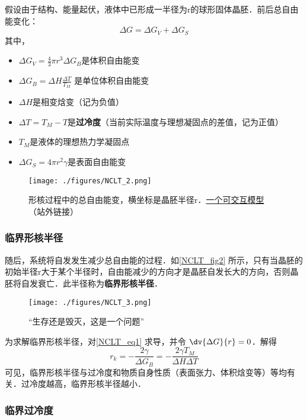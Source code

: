 假设由于结构、能量起伏，液体中已形成一半径为r的球形固体晶胚．前后总自由能变化： 
\begin{equation}\label{NCLT_eq1}
\Delta G  = \Delta G_V +\Delta G_S
\end{equation}
其中，
\begin{itemize}
\item $\Delta G_V = \frac{4}{3}\pi r^3 \Delta G_B$是体积自由能变
\item $\Delta G_B = \Delta H \frac{\Delta T}{T_M}$ 是单位体积自由能变
\item $\Delta H$是相变焓变（记为负值）
\item $\Delta T=T_M-T$是\textbf{过冷度}（当前实际温度与理想凝固点的差值，记为正值）
\item $T_M$是液体的理想热力学凝固点
\item $\Delta G_S = 4\pi r^2 \gamma$是表面自由能变
\end{itemize}

\begin{figure}[ht]
\centering
\texttt{[image: ./figures/NCLT\_2.png]}
\caption{形核过程中的总自由能变，横坐标是晶胚半径r．\href{https://www.geogebra.org/m/prktxhhk}{一个可交互模型}（站外链接）} \label{NCLT_fig2}
\end{figure}

\subsubsection{临界形核半径}
随后，系统将自发发生减少总自由能的过程．如\autoref{NCLT_fig2} 所示，只有当晶胚的初始半径r大于某个半径时，自由能减少的方向才是晶胚自发长大的方向，否则晶胚将自发衰亡．此半径称为\textbf{临界形核半径}．
\begin{figure}[ht]
\centering
\texttt{[image: ./figures/NCLT\_3.png]}
\caption{“生存还是毁灭，这是一个问题”} \label{NCLT_fig3}
\end{figure}

为求解临界形核半径，对\autoref{NCLT_eq1} 求导，并令 $\dv{\Delta G}{r} = 0$．解得
\begin{equation}
r_k=-\frac{2\gamma}{\Delta G_B}=-\frac{2\gamma T_M}{\Delta H \Delta T}
\end{equation}
可见，临界形核半径与过冷度和物质自身性质（表面张力、体积焓变等）等均有关．过冷度越高，临界形核半径越小．

\subsubsection{临界过冷度}

